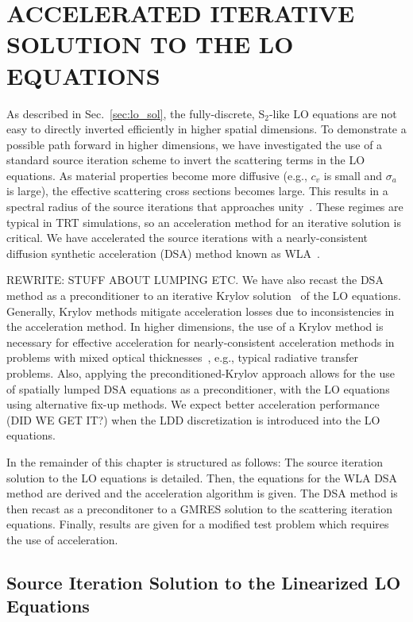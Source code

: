 
\chapter{\uppercase {Accelerated Iterative Solution to the LO Equations}}

As described in Sec.~\ref{sec:lo_sol}, the fully-discrete, S$_2$-like LO equations
are not easy to directly inverted efficiently in higher spatial dimensions.  
To demonstrate a possible path forward in
higher dimensions, we have investigated the use of a standard
source iteration scheme to invert the scattering terms in the LO equations.  As
material properties become more diffusive (e.g., $c_v$ is small and $\sigma_a$ is
large), the effective scattering cross sections becomes large.  This results in a spectral radius of the source iterations that approaches
unity~\cite{morel_ldtrt}.  These regimes are typical in TRT simulations, so an
acceleration method for an iterative solution is critical. 
We have accelerated the source iterations with a nearly-consistent diffusion synthetic acceleration
(DSA) method known as WLA~\cite{wla,wla_thesis}.

REWRITE: STUFF ABOUT LUMPING ETC.
We have also recast the DSA method as a preconditioner to an iterative
Krylov solution~\cite{larson_morel_sn} of the LO equations.  Generally, Krylov
methods mitigate acceleration losses due to inconsistencies in the acceleration
method.  In higher dimensions, the use of a Krylov method is necessary for effective
acceleration for nearly-consistent acceleration methods in problems with
mixed optical thicknesses~\cite{larson_morel_sn}, e.g., typical radiative transfer
problems.  Also, applying the preconditioned-Krylov approach allows for the use of
spatially lumped DSA  equations as a preconditioner, with the LO equations using
alternative fix-up methods.  We expect better acceleration performance (DID WE GET IT?) when the
LDD discretization is introduced into the LO equations. 

In the remainder of this chapter is structured as follows:  The source
iteration solution to the LO equations is detailed.  Then, the equations for the WLA DSA
method are derived and the acceleration algorithm is given.  The DSA method is then recast
as a preconditoner to a GMRES solution to the scattering iteration equations.  Finally,
results are given for a modified test problem which requires the use of acceleration.

\section{Source Iteration Solution to the Linearized LO Equations}

